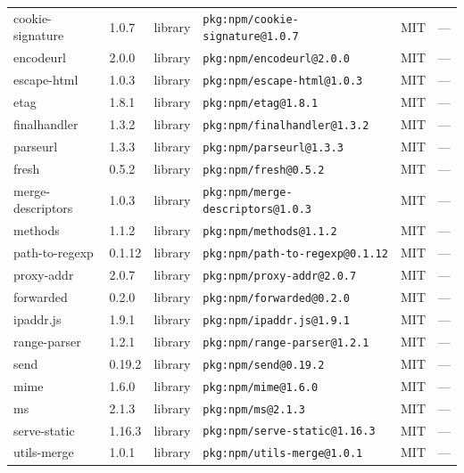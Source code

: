 \documentclass[11pt,a4paper]{article}
\begin{document}
\begin{longtable}{|p{4cm}|p{2cm}|p{1.6cm}|p{5cm}|p{1.5cm}|p{3.5cm}|}
\raggedright cookie-signature & 1.0.7 & library & \small\texttt{pkg:npm/cookie-signature@1.0.7} & MIT & \small — \\
\raggedright encodeurl & 2.0.0 & library & \small\texttt{pkg:npm/encodeurl@2.0.0} & MIT & \small — \\
\raggedright escape-html & 1.0.3 & library & \small\texttt{pkg:npm/escape-html@1.0.3} & MIT & \small — \\
\raggedright etag & 1.8.1 & library & \small\texttt{pkg:npm/etag@1.8.1} & MIT & \small — \\
\raggedright finalhandler & 1.3.2 & library & \small\texttt{pkg:npm/finalhandler@1.3.2} & MIT & \small — \\
\raggedright parseurl & 1.3.3 & library & \small\texttt{pkg:npm/parseurl@1.3.3} & MIT & \small — \\
\raggedright fresh & 0.5.2 & library & \small\texttt{pkg:npm/fresh@0.5.2} & MIT & \small — \\
\raggedright merge-descriptors & 1.0.3 & library & \small\texttt{pkg:npm/merge-descriptors@1.0.3} & MIT & \small — \\
\raggedright methods & 1.1.2 & library & \small\texttt{pkg:npm/methods@1.1.2} & MIT & \small — \\
\raggedright path-to-regexp & 0.1.12 & library & \small\texttt{pkg:npm/path-to-regexp@0.1.12} & MIT & \small — \\
\raggedright proxy-addr & 2.0.7 & library & \small\texttt{pkg:npm/proxy-addr@2.0.7} & MIT & \small — \\
\raggedright forwarded & 0.2.0 & library & \small\texttt{pkg:npm/forwarded@0.2.0} & MIT & \small — \\
\raggedright ipaddr.js & 1.9.1 & library & \small\texttt{pkg:npm/ipaddr.js@1.9.1} & MIT & \small — \\
\raggedright range-parser & 1.2.1 & library & \small\texttt{pkg:npm/range-parser@1.2.1} & MIT & \small — \\
\raggedright send & 0.19.2 & library & \small\texttt{pkg:npm/send@0.19.2} & MIT & \small — \\
\raggedright mime & 1.6.0 & library & \small\texttt{pkg:npm/mime@1.6.0} & MIT & \small — \\
\raggedright ms & 2.1.3 & library & \small\texttt{pkg:npm/ms@2.1.3} & MIT & \small — \\
\raggedright serve-static & 1.16.3 & library & \small\texttt{pkg:npm/serve-static@1.16.3} & MIT & \small — \\
\raggedright utils-merge & 1.0.1 & library & \small\texttt{pkg:npm/utils-merge@1.0.1} & MIT & \small — \\

\end{longtable}
\end{document}

